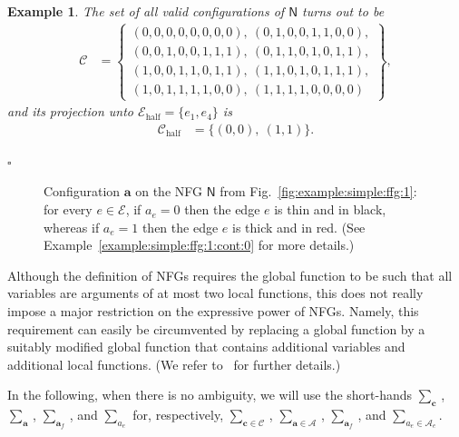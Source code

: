 \documentclass[journal, twocolumn]{IEEEtran}
\renewcommand{\mathbf}[1]{{\bm{#1}}}
\newcommand{\vect}[1]{\mathbf{#1}}
\newcommand{\code}[1]{\mathcal{#1}}
\newcommand{\set}[1]{\mathcal{#1}}
\newcommand{\graph}[1]{\mathsf{#1}}
\newcommand{\codeC}{\code{C}}
\newcommand{\codeCedgehalf}{\code{C}_{\mathrm{half}}}
\newcommand{\setA}{\set{A}}
\newcommand{\setC}{\set{C}}
\newcommand{\setE}{\set{E}}
\newcommand{\setEhalf}{\set{E}_{\mathrm{half}}}
\newcommand{\va}{\vect{a}}
\newcommand{\vc}{\vect{c}}
\newcommand{\graphN}{\graph{N}}
\newcommand{\?}{\mathrm{?}}
\newcommand{\qedwhite}{\hspace*{\fill}%
  $\square$\smallskip}
\newcommand{\exampleend}{\qedwhite}
\newtheorem{Example}[Lemma]{Example}
\begin{document}
\begin{Example}
  The set of all valid configurations of $\graphN$ turns out to be
  \begin{align}
    \codeC
      &= \left\{
           \begin{array}{c}
             (0,0,0,0,0,0,0,0), \
             (0,1,0,0,1,1,0,0), \\
             (0,0,1,0,0,1,1,1), \
             (0,1,1,0,1,0,1,1), \\
             (1,0,0,1,1,0,1,1), \
             (1,1,0,1,0,1,1,1), \\
             (1,0,1,1,1,1,0,0), \
             (1,1,1,1,0,0,0,0)\phantom{,}
           \end{array}
         \right\},
           \label{eq:example:simple:ffg:1:valid:configurations:1}
  \end{align}
  and its projection unto $\setEhalf = \{ e_1, e_4 \}$ is
  \begin{align*}
    \codeCedgehalf
      &= \big\{
           (0,0), \ (1,1)
         \big\}.
  \end{align*}
  
  

  \exampleend

\end{Example}


\begin{figure}
  \begin{center}
  \end{center}
  \caption{Configuration $\va$ on the NFG $\graphN$ from
    Fig.~\ref{fig:example:simple:ffg:1}: for every $e \in \setE$, if $a_e = 0$
    then the edge $e$ is thin and in black, whereas if $a_e = 1$ then the edge
    $e$ is thick and in red. (See Example~\ref{example:simple:ffg:1:cont:0}
    for more details.)}
  \label{fig:example:simple:ffg:1:mod:2}
\end{figure}


Although the definition of NFGs requires the global function to be such that
all variables are arguments of at most two local functions, this does not
really impose a major restriction on the expressive power of NFGs. Namely,
this requirement can easily be circumvented by replacing a global function by
a suitably modified global function that contains additional variables and
additional local functions. (We refer to~\cite{Forney:01:1, Loeliger:04:1} for
further details.)


In the following, when there is no ambiguity, we will use the short-hands
$\sum_{\vc}$\,, $\sum_{\va}$\,, $\sum_{\va_f}$\,, and $\sum_{a_e}$ for,
respectively, $\sum_{\vc \in \setC}$\,, $\sum_{\va \in \setA}$\,,
$\sum_{\va_f}$\,, and $\sum_{a_e \in \setA_e}$.
\end{document}
